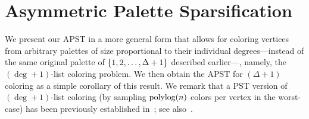 
\newcommand{\Nforward}[1]{\ensuremath{N^{>}_{\pi}(#1)}}
\newcommand{\degForward}[1]{\ensuremath{\deg^{>}_{\pi}(#1)}}



\section{Asymmetric Palette Sparsification}\label{thm:apst}

We present our APST in a more general form that allows for coloring vertices from arbitrary palettes of size proportional to their individual degrees---instead of the same original palette of $\left\{ 1,2,\ldots,\Delta+1 \right\}$ described earlier---, namely, the $(\deg+1)$-list coloring problem. We then obtain the APST for $(\Delta+1)$ coloring as a simple corollary of this result. We remark that a PST version of $(\deg+1)$-list coloring (by sampling $\mbox{\rm polylog}{(n)}$ colors per vertex in the worst-case) 
has been previously established in~\cite{HalldorssonKNT22}; see also~\cite{AlonA20}. 

